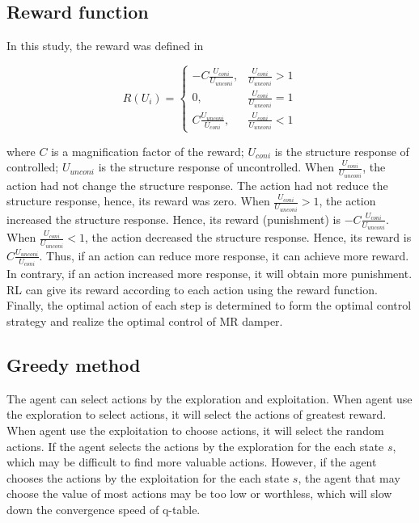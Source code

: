 \subsection{Reward function}


In this study, the reward was defined in

\begin{equation}
R(U_i)=
\begin{cases}
-C \frac{U_{coni}}{U_{unconi}},  & \frac{U_{coni}}{U_{unconi}} > 1 \\
0, & \frac{U_{coni}}{U_{unconi}} = 1 \\
C \frac{U_{unconi}}{U_{coni}}, & \frac{U_{coni}}{U_{unconi}} < 1 
\end{cases}
\end{equation}

where $C$ is a magnification factor of the reward; $U_{coni}$ is the structure response of controlled; $U_{unconi}$ is the structure response of uncontrolled. When $ \frac{U_{coni}}{U_{unconi}} $, the action had not change the structure response. The action had not reduce the structure response, hence, its reward was zero. When $\frac{U_{coni}}{U_{unconi}} > 1$, the action increased the structure response. Hence, its reward (punishment) is $-C \frac{U_{coni}}{U_{unconi}}$. When $\frac{U_{coni}}{U_{unconi}} < 1$, the action decreased the structure response. Hence, its reward is $C \frac{U_{unconi}}{U_{coni}}$. Thus, if an action can reduce more response, it can achieve more reward. In contrary, if an action increased more response, it will obtain more punishment. RL can give its reward according to each action using the reward function. Finally, the optimal action of each step is determined to form the optimal control strategy and realize the optimal control of MR damper.

\subsection{Greedy method}
The agent can select actions by the exploration and exploitation. When agent use the exploration to select actions, it will select the actions of greatest reward. When agent use the exploitation to choose actions, it will select the random actions. If the agent selects the actions by the exploration for the each state $s$, which may be difficult to find more valuable actions. However, if the agent chooses the actions by the exploitation for the each state $s$, the agent that may choose the value of most actions may be too low or worthless, which will slow down the convergence speed of q-table.

